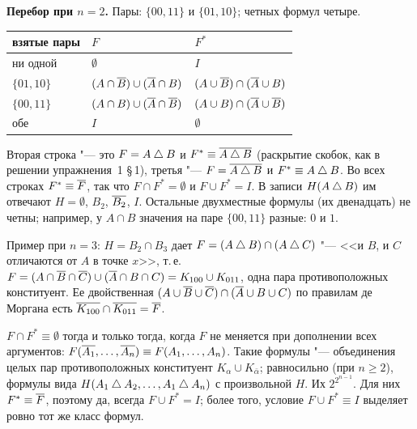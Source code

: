 \begin{solution}[3 (\S\,3)]
\textbf{Перебор при $n=2$.} Пары: $\{00,11\}$ и $\{01,10\}$; четных формул
четыре.
\begin{center}\small
\begin{tabular}{@{}lll@{}}
\toprule
взятые пары & $F$ & $F^*$\\ \midrule
ни одной & $\emptyset$ & $I$\\
$\{01,10\}$ & $(A\cap\overline{B})\cup(\overline{A}\cap B)$ & $(A\cup\overline{B})\cap(\overline{A}\cup B)$\\
$\{00,11\}$ & $(A\cap B)\cup(\overline{A}\cap\overline{B})$ & $(A\cup B)\cap(\overline{A}\cup\overline{B})$\\
обе & $I$ & $\emptyset$\\
\bottomrule
\end{tabular}
\end{center}
Вторая строка "--- это $F=A\mathbin{\triangle} B$ и $F^*\equiv\overline{A\mathbin{\triangle} B}$ (раскрытие скобок,
как в решении упражнения~1 \S\,1), третья "--- $F=\overline{A\mathbin{\triangle} B}$ и
$F^*\equiv A\mathbin{\triangle} B$.
Во всех строках $F^*\equiv\overline{F}$, так что $F\cap F^*=\emptyset$ и
$F\cup F^*=I$. В записи $H(A\mathbin{\triangle} B)$ им отвечают $H=\emptyset$, $B_2$,
$\overline{B_2}$, $I$. Остальные двухместные формулы (их двенадцать) не
четны; например, у $A\cap B$ значения на паре $\{00,11\}$ разные: $0$ и $1$.

Пример при $n=3$: $H=B_2\cap B_3$ дает $F=(A\mathbin{\triangle} B)\cap(A\mathbin{\triangle} C)$ "--- <<и $B$,
и $C$ отличаются от $A$ в точке $x$>>, т.\,е. $F=(A\cap\overline{B}\cap\overline{C})\cup
(\overline{A}\cap B\cap C)=K_{100}\cup K_{011}$, одна пара противоположных
конституент. Ее двойственная
$(A\cup\overline{B}\cup\overline{C})\cap(\overline{A}\cup B\cup C)$ по правилам де Моргана есть
$\overline{K_{100}}\cap\overline{K_{011}}=\overline{F}$.

\answer $F\cap F^*\equiv\emptyset$ тогда и только тогда, когда $F$ не
меняется при дополнении всех аргументов:
$F(\overline{A_1},\dots,\overline{A_n})\equiv F(A_1,\dots,A_n)$. Такие формулы "---
объединения целых пар противоположных конституент $K_\alpha\cup K_{\bar\alpha}$;
равносильно (при $n\ge2$), формулы вида
$H(A_1\mathbin{\triangle} A_2,\dots,A_1\mathbin{\triangle} A_n)$ с произвольной $H$. Их $2^{2^{n-1}}$. Для
них $F^*\equiv\overline{F}$, поэтому да, всегда $F\cup F^*=I$; более того,
условие $F\cup F^*\equiv I$ выделяет ровно тот же класс формул.
\end{solution}

